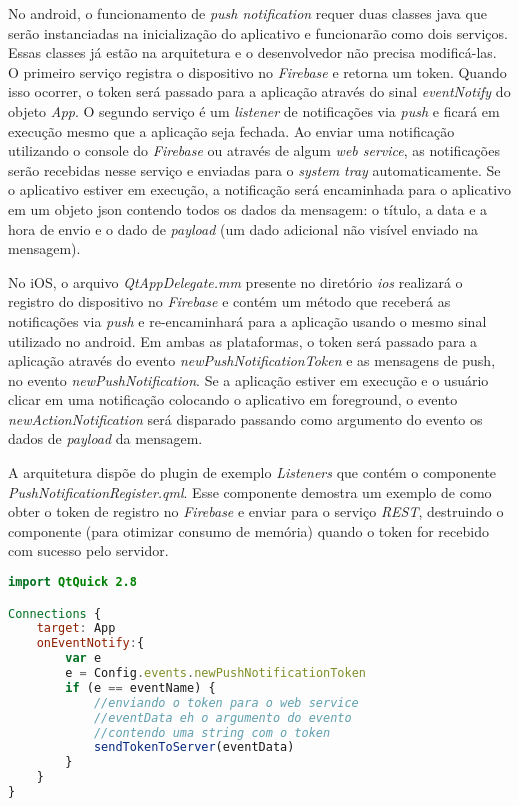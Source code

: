 No android, o funcionamento de \textit{push notification} requer duas classes java que serão instanciadas na inicialização do aplicativo e funcionarão como dois serviços. Essas classes já estão na arquitetura e o desenvolvedor não precisa modificá-las. O primeiro serviço registra o dispositivo no \textit{Firebase} e retorna um token. Quando isso ocorrer, o token será passado para a aplicação através do sinal \textit{eventNotify} do objeto \textit{App}. O segundo serviço é um \textit{listener} de notificações via \textit{push} e ficará em execução mesmo que a aplicação seja fechada. Ao enviar uma notificação utilizando o console do \textit{Firebase} ou através de algum \textit{web service}, as notificações serão recebidas nesse serviço e enviadas para o \textit{system tray} automaticamente. Se o aplicativo estiver em execução, a notificação será encaminhada para o aplicativo em um objeto json contendo todos os dados da mensagem: o título, a data e a hora de envio e o dado de \textit{payload} (um dado adicional não visível enviado na mensagem).\par

No iOS, o arquivo \textit{QtAppDelegate.mm} presente no diretório \textit{ios} realizará o registro do dispositivo no \textit{Firebase} e contém um método que receberá as notificações via \textit{push} e re-encaminhará para a aplicação usando o mesmo sinal utilizado no android. Em ambas as plataformas, o token será passado para a aplicação através do evento \textit{newPushNotificationToken} e as mensagens de push, no evento \textit{newPushNotification}. Se a aplicação estiver em execução e o usuário clicar em uma notificação colocando o aplicativo em foreground, o evento \textit{newActionNotification} será disparado passando como argumento do evento os dados de \textit{payload} da mensagem.\par

A arquitetura dispõe do plugin de exemplo \textit{Listeners} que contém o componente \textit{PushNotificationRegister.qml}. Esse componente demostra um exemplo de como obter o token de registro no \textit{Firebase} e enviar para o serviço \textit{REST}, destruindo o componente (para otimizar consumo de memória) quando o token for recebido com sucesso pelo servidor.

\begin{center}
\begin{lstlisting}[language=qml]
import QtQuick 2.8

Connections {
    target: App
    onEventNotify:{
		var e
		e = Config.events.newPushNotificationToken
		if (e == eventName) {
			//enviando o token para o web service
			//eventData eh o argumento do evento
			//contendo uma string com o token
			sendTokenToServer(eventData)
		}
	}
}
\end{lstlisting}
\end{center}

